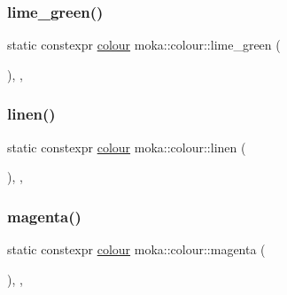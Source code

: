 \mbox{\label{classmoka_1_1colour_a47cbf0375a2ca712b398b35518787c96}} 
\subsubsection{\texorpdfstring{lime\_green()}{lime\_green()}}
{\footnotesize\ttfamily static constexpr \mbox{\hyperlink{classmoka_1_1colour}{colour}} moka\+::colour\+::lime\+\_\+green (\begin{DoxyParamCaption}{ }\end{DoxyParamCaption})\hspace{0.3cm}{\ttfamily [inline]}, {\ttfamily [static]}, {\ttfamily [noexcept]}}

\mbox{\label{classmoka_1_1colour_a4ec7680384f8e5cb605e1f4841e04eba}} 
\subsubsection{\texorpdfstring{linen()}{linen()}}
{\footnotesize\ttfamily static constexpr \mbox{\hyperlink{classmoka_1_1colour}{colour}} moka\+::colour\+::linen (\begin{DoxyParamCaption}{ }\end{DoxyParamCaption})\hspace{0.3cm}{\ttfamily [inline]}, {\ttfamily [static]}, {\ttfamily [noexcept]}}

\mbox{\label{classmoka_1_1colour_ad6fb2a2ae44257c285f191398a51303f}} 
\subsubsection{\texorpdfstring{magenta()}{magenta()}}
{\footnotesize\ttfamily static constexpr \mbox{\hyperlink{classmoka_1_1colour}{colour}} moka\+::colour\+::magenta (\begin{DoxyParamCaption}{ }\end{DoxyParamCaption})\hspace{0.3cm}{\ttfamily [inline]}, {\ttfamily [static]}, {\ttfamily [noexcept]}}

